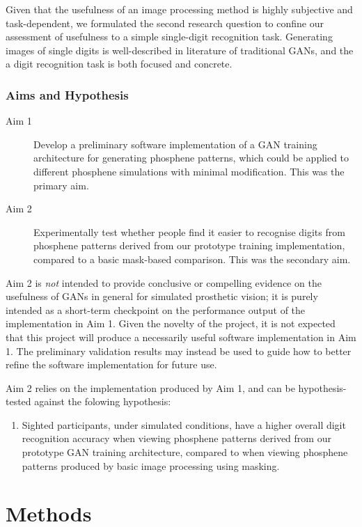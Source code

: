 \documentclass[a4paper,11pt,openany]{book}
\begin{document}
Given that the usefulness of an image processing method is highly subjective and task-dependent, we formulated the second research question to confine our assessment of usefulness to a simple single-digit recognition task.
Generating images of single digits is well-described in literature of traditional GANs, and the a digit recognition task is both focused and concrete.

\section*{Aims and Hypothesis}
\label{sec:org257d1c5}

\begin{description}
\item[{Aim 1}] Develop a preliminary software implementation of a GAN training architecture for generating phosphene patterns, which could be applied to different phosphene simulations with minimal modification. This was the primary aim.
\item[{Aim 2}] Experimentally test whether people find it easier to recognise digits from phosphene patterns derived from our prototype training implementation, compared to a basic mask-based comparison. This was the secondary aim.
\end{description}

Aim 2 is \emph{not} intended to provide conclusive or compelling evidence on the usefulness of GANs in general for simulated prosthetic vision; it is purely intended as a short-term checkpoint on the performance output of the implementation in Aim 1.
Given the novelty of the project, it is not expected that this project will produce a necessarily useful software implementation in Aim 1.
The preliminary validation results may instead be used to guide how to better refine the software implementation for future use.

Aim 2 relies on the implementation produced by Aim 1, and can be hypothesis-tested against the folowing hypothesis:

\begin{enumerate}
\item Sighted participants, under simulated conditions, have a higher overall digit recognition accuracy when viewing phosphene patterns derived from our prototype GAN training architecture, compared to when viewing phosphene patterns produced by basic image processing using masking.
\end{enumerate}

\part{Methods}
\label{sec:orgb192d5f}
\end{document}
